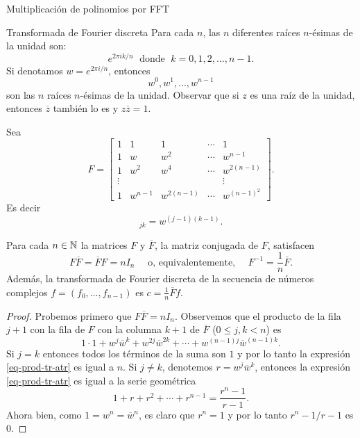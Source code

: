 \begin{chapter}{Multiplicación de polinomios por FFT}
\begin{section}{Transformada de Fourier discreta}
        Para cada $n$, las $n$ diferentes raíces $n$-ésimas de la unidad son:
        $$
        e^{2 \pi i k/n} \;\text{ donde }\;  k = 0, 1, 2, \ldots, n-1.
        $$
        Si denotamos $w = e^{2 \pi i/n}$, entonces 
        $$
        w^0, w^1,\ldots,w^{n-1} 
        $$ son las $n$ raíces $n$-ésimas de la unidad. Observar que si $z$ es una raíz de la unidad, entonces $\overline{z}$ también lo es y $z\overline{z} =1$.  

        Sea
        \begin{equation*}
            F = \begin{bmatrix}
                1 & 1 & 1 & \cdots & 1 \\
                1 & w & w^2 & \cdots & w^{n-1} \\
                1 & w^2 & w^4 & \cdots & w^{2(n-1)} 
                \\ \vdots & &  &  &\vdots \\
                1 & w^{n-1} &w^{2(n-1)} & \cdots & w^{(n-1)^2} 
            \end{bmatrix}.
        \end{equation*}
        Es decir 
        \begin{equation*}
            [F]_{jk} = w^{(j-1)(k-1)}.
        \end{equation*}


        \begin{teorema}
            Para cada $n \in \mathbb N$ la matrices $F$ y $\overline{F}$, la matriz conjugada de $F$,   satisfacen
            \begin{equation*}
                F \overline{F} = \overline{F}F = nI_n\quad\text{ o,  equivalentemente, }\quad F^{-1} = \frac{1}{n}  \overline{F}.  
            \end{equation*}
            Además, la transformada de Fourier discreta de la secuencia de números complejos $f = (f_0,\ldots,f_{n-1})$ es $c = \displaystyle\frac{1}{n} \overline{F}f$.
        \end{teorema}
        \begin{proof}
            Probemos primero que $F \overline{F} = nI_n$. Observemos que el producto de la fila $j + 1 $ con la fila de $F$ con la columna $k +  1$ de $\overline{F}$  ($0 \le j, k < n$) es 
            \begin{equation}\label{eq-prod-tr-atr}
                1\cdot1 + w^j\overline{w}^k + w^{2j}\overline{w}^{2k} + \cdots +  w^{(n-1)j}\overline{w}^{(n-1)k}. 
            \end{equation}
            Si $j=k$  entonces todos los términos de la suma son $1$ y por lo tanto  la expresión \ref{eq-prod-tr-atr} es igual a $n$. Si $j \not= k$,
            denotemos $r =  w^j\overline{w}^k$,  entonces la expresión \ref{eq-prod-tr-atr} es igual a la serie geométrica
            \begin{equation*}
                1 +  r + r^2+ \cdots +r^{n-1} = \frac{r^n -1}{r -1}.
            \end{equation*}
            Ahora bien, como $1 = w^n = \overline{w}^n$, es claro que $r^n = 1$ y  por lo tanto $r^n -1/r -1$ es $0$. 


\end{proof}
\end{section}
\end{chapter}

